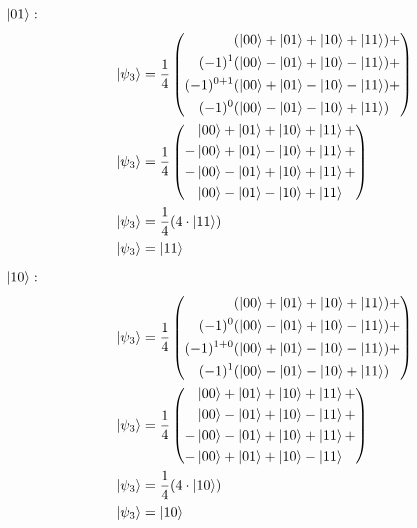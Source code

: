 \documentclass{article}
\begin{document}
$\ket{01}:$ \\
\begin{align*}
&&      \ket{\psi_3} &= \frac{1}{4}\left(
        \begin{aligned}
                 &(\ket{00} + \ket{01} + \ket{10} + \ket{11}) + \\
          (-1)^1 &(\ket{00} - \ket{01} + \ket{10} - \ket{11}) + \\
    (-1)^{0 + 1} &(\ket{00} + \ket{01} - \ket{10} - \ket{11}) + \\
          (-1)^0 &(\ket{00} - \ket{01} - \ket{10} + \ket{11}) \\
        \end{aligned}
    \right) \\
&&      \ket{\psi_3} &= \frac{1}{4}\left(
        \begin{aligned}
                 &\ket{00} + \ket{01} + \ket{10} + \ket{11} + \\
                -&\ket{00} + \ket{01} - \ket{10} + \ket{11} + \\
                -&\ket{00} - \ket{01} + \ket{10} + \ket{11} + \\
                 &\ket{00} - \ket{01} - \ket{10} + \ket{11} \\
        \end{aligned}
    \right) \\
&&      \ket{\psi_3} &= \frac{1}{4}(4 \cdot \ket{11}) \\
&&      \ket{\psi_3} &= \ket{11} \\
\end{align*}
\newpage
$\ket{10}:$ \\
\begin{align*}
&&      \ket{\psi_3} &= \frac{1}{4}\left(
        \begin{aligned}
                 &(\ket{00} + \ket{01} + \ket{10} + \ket{11}) + \\
          (-1)^0 &(\ket{00} - \ket{01} + \ket{10} - \ket{11}) + \\
    (-1)^{1 + 0} &(\ket{00} + \ket{01} - \ket{10} - \ket{11}) + \\
          (-1)^1 &(\ket{00} - \ket{01} - \ket{10} + \ket{11}) \\
        \end{aligned}
    \right) \\
&&      \ket{\psi_3} &= \frac{1}{4}\left(
        \begin{aligned}
                 &\ket{00} + \ket{01} + \ket{10} + \ket{11} + \\
                 &\ket{00} - \ket{01} + \ket{10} - \ket{11} + \\
                -&\ket{00} - \ket{01} + \ket{10} + \ket{11} + \\
                -&\ket{00} + \ket{01} + \ket{10} - \ket{11} \\
        \end{aligned}
    \right) \\
&&      \ket{\psi_3} &= \frac{1}{4}(4 \cdot \ket{10}) \\
&&        \ket{\psi_3} &= \ket{10}
\end{align*}
\end{document}
